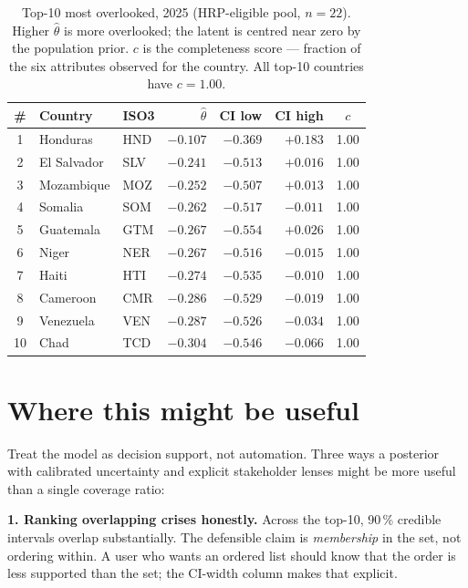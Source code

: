 \documentclass[11pt,a4paper]{article}
\begin{document}
\begin{table}[H]
\centering
\small
\begin{tabular}{@{}cllrrrc@{}}
\toprule
\textbf{\#} & \textbf{Country} & \textbf{ISO3} & \textbf{$\widehat\theta$} & \textbf{CI low} & \textbf{CI high} & \textbf{$c$} \\
\midrule
 1 & Honduras    & HND & $-0.107$ & $-0.369$ & $+0.183$ & 1.00 \\
 2 & El Salvador & SLV & $-0.241$ & $-0.513$ & $+0.016$ & 1.00 \\
 3 & Mozambique  & MOZ & $-0.252$ & $-0.507$ & $+0.013$ & 1.00 \\
 4 & Somalia     & SOM & $-0.262$ & $-0.517$ & $-0.011$ & 1.00 \\
 5 & Guatemala   & GTM & $-0.267$ & $-0.554$ & $+0.026$ & 1.00 \\
 6 & Niger       & NER & $-0.267$ & $-0.516$ & $-0.015$ & 1.00 \\
 7 & Haiti       & HTI & $-0.274$ & $-0.535$ & $-0.010$ & 1.00 \\
 8 & Cameroon    & CMR & $-0.286$ & $-0.529$ & $-0.019$ & 1.00 \\
 9 & Venezuela   & VEN & $-0.287$ & $-0.526$ & $-0.034$ & 1.00 \\
10 & Chad        & TCD & $-0.304$ & $-0.546$ & $-0.066$ & 1.00 \\
\bottomrule
\end{tabular}
\caption{Top-10 most overlooked, 2025 (HRP-eligible pool, $n = 22$). Higher
$\widehat\theta$ is more overlooked; the latent is centred near zero by the
population prior. $c$ is the completeness score --- fraction of the six
attributes observed for the country. All top-10 countries have
$c = 1.00$.\label{tab:top10}}
\end{table}

\section{Where this might be useful}

Treat the model as decision support, not automation. Three ways a posterior
with calibrated uncertainty and explicit stakeholder lenses might be more
useful than a single coverage ratio:

\textbf{1. Ranking overlapping crises honestly.} Across the top-10, 90\,\%
credible intervals overlap substantially. The defensible claim is
\emph{membership} in the set, not ordering within. A user who wants an
ordered list should know that the order is less supported than the set;
the CI-width column makes that explicit.
\end{document}
